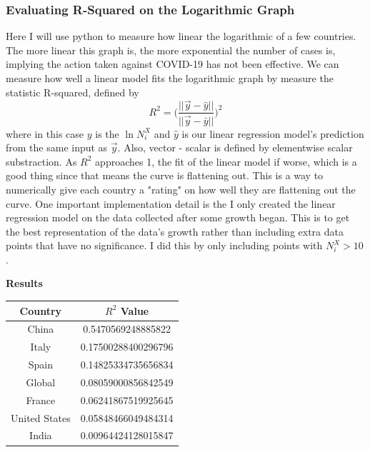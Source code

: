 \documentclass{report}
\begin{document}
            \subsubsection{Evaluating R-Squared on the Logarithmic Graph}
                Here I will use python to measure how linear the logarithmic of a few countries. The more linear this graph is, the more exponential the number of cases is, implying the action taken against COVID-19 has not been effective.
                \newline\indent
                We can measure how well a linear model fits the logarithmic graph by measure the statistic R-squared, defined by
                \begin{equation}
                    R^2 = \big(\dfrac{||\vec{y} - \hat{y}||}{||\vec{y} - \bar{y}||}\big)^2
                \end{equation}
                where in this case $y$ is the $\ln N^X_i$ and $\hat{y}$ is our linear regression model's prediction from the same input as $\vec{y}$. Also, vector - scalar is defined by elementwise scalar substraction. 
                \newline\indent
                As $R^2$ approaches 1, the fit of the linear model if worse, which is a good thing since that means the curve is flattening out. This is a way to numerically give each country a "rating" on how well they are flattening out the curve.
                \newline\indent
                One important implementation detail is the I only created the linear regression model on the data collected after some growth began. This is to get the best representation of the data's growth rather than including extra data points that have no significance. I did this by only including points with $N^X_i > 10$.                
                \newline
                \begin{center}
                    \textbf{Results}
                    \begin{tabular}{||c | c||}
                        \hline
                        Country & $R^2$ Value \\
                        \hline\hline
                        China & 0.5470569248885822 \\
                        Italy & 0.17500288400296796 \\
                        Spain & 0.14825334735656834 \\
                        Global & 0.08059000856842549 \\
                        France & 0.06241867519925645 \\
                        United States & 0.05848466049484314 \\
                        India & 0.00964424128015847 \\
                        \hline
                    \end{tabular}
                \end{center}
\end{document}
